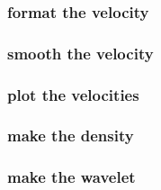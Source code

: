 \begin{frame} \frametitle{format the velocity}
  \normalsize
  \blueshade{
    
  }
\end{frame}
\cwpnote{}

\begin{frame} \frametitle{smooth the velocity}
  \normalsize
  \blueshade{
    
  }
\end{frame}
\cwpnote{}

\begin{frame} \frametitle{plot the velocities}
  \normalsize
  \blueshade{
    
  }
\end{frame}
\cwpnote{}

\begin{frame} 
\end{frame}
\begin{frame}  \end{frame}
\begin{frame}  \end{frame}

\begin{frame} \frametitle{make the density}
  \normalsize
  \blueshade{
    
  }
\end{frame}
\cwpnote{}

\begin{frame} \frametitle{make the wavelet}
  \normalsize
  \blueshade{
    
  }
\end{frame}
\cwpnote{}

\begin{frame}  \end{frame}
\begin{frame}  \end{frame}

